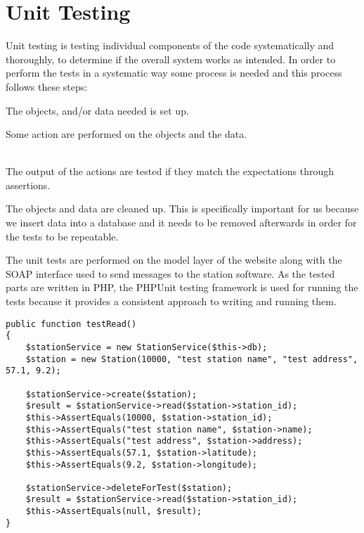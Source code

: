 \section{Unit Testing}
Unit testing is testing individual components of the code systematically and thoroughly, to determine if the overall system works as intended.
In order to perform the tests in a systematic way some process is needed and this process follows these steps:

\begin{description}[style=nextline]
\item[Set Up] The objects, and/or data needed is set up.
\item[Action] Some action are performed on the objects and the data.
\item[Test] \hfill \\ 
The output of the actions are tested if they match the expectations through assertions.
\item[Tear Down/Clean Up] The objects and data are cleaned up. This is specifically important for us because we insert data into a database and it needs to be removed afterwards in order for the tests to be repeatable.
\end{description}

The unit tests are performed on the model layer of the website along with the SOAP interface used to send messages to the station software.
As the tested parts are written in PHP, the PHPUnit testing framework is used for running the tests because it provides a consistent approach to writing and running them.

\begin{lstlisting}[caption = {Example of a unit test}, label = {lst:unitTestExample}]
public function testRead()
{
	$stationService = new StationService($this->db);
	$station = new Station(10000, "test station name", "test address", 57.1, 9.2);

	$stationService->create($station);
	$result = $stationService->read($station->station_id);
	$this->AssertEquals(10000, $station->station_id);
	$this->AssertEquals("test station name", $station->name);
	$this->AssertEquals("test address", $station->address);
	$this->AssertEquals(57.1, $station->latitude);
	$this->AssertEquals(9.2, $station->longitude);

	$stationService->deleteForTest($station);
	$result = $stationService->read($station->station_id);
	$this->AssertEquals(null, $result);
}
\end{lstlisting}

